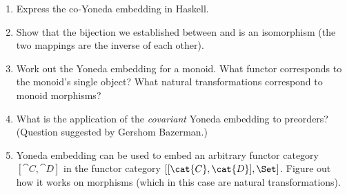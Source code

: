 \begin{enumerate}
\tightlist
\item
  Express the co-Yoneda embedding in Haskell.
\item
  Show that the bijection we established between  and
   is an isomorphism (the two mappings are the inverse of
  each other).
\item
  Work out the Yoneda embedding for a monoid. What functor corresponds
  to the monoid's single object? What natural transformations correspond
  to monoid morphisms?
\item
  What is the application of the \emph{covariant} Yoneda embedding to
  preorders? (Question suggested by Gershom Bazerman.)
\item
  Yoneda embedding can be used to embed an arbitrary functor category
  $[\cat{C}, \cat{D}]$ in the functor category
  $[[\cat{C}, \cat{D}], \Set]$. Figure out how it works on morphisms
  (which in this case are natural transformations).
\end{enumerate}